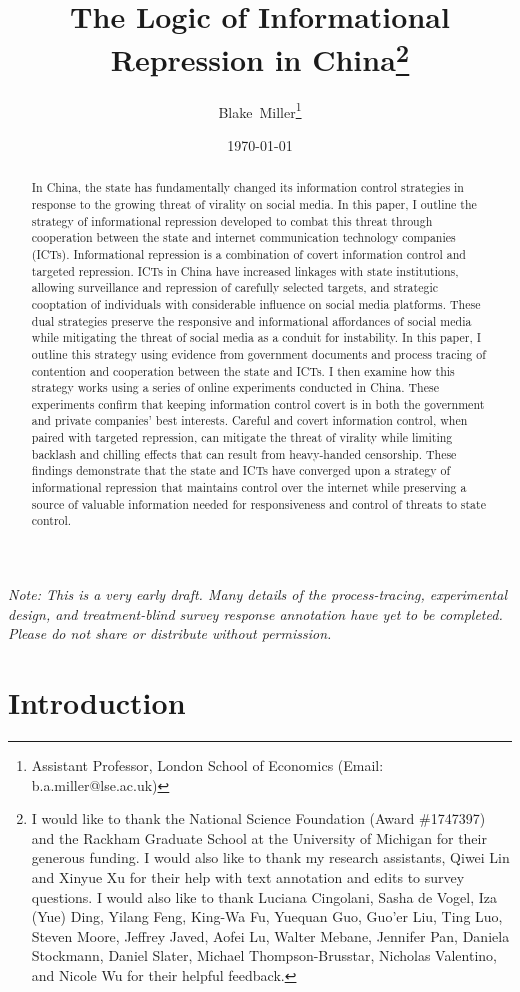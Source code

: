 \documentclass[11pt]{article}
\title{The Logic of Informational Repression in China\thanks{\normalsize I would like to thank the National Science Foundation (Award \#1747397) and the Rackham Graduate School at the University of Michigan for their generous funding. I would also like to thank my research assistants, Qiwei Lin and Xinyue Xu for their help with text annotation and edits to survey questions. I would also like to thank Luciana Cingolani, Sasha de Vogel, Iza (Yue) Ding, Yilang Feng, King-Wa Fu, Yuequan Guo, Guo'er Liu, Ting Luo, Steven Moore, Jeffrey Javed, Aofei Lu, Walter Mebane, Jennifer Pan, Daniela Stockmann, Daniel Slater, Michael Thompson-Brusstar, Nicholas Valentino, and Nicole Wu for their helpful feedback.}\\ \large }
\author{Blake\ Miller\thanks{\normalsize{Assistant Professor, London School of Economics} (Email: \mbox{b.a.miller@lse.ac.uk})}}
\date{\today}
\begin{document}
\maketitle

\begin{abstract}
\begin{normalsize}
In China, the state has fundamentally changed its information control strategies in response to the growing threat of virality on social media. In this paper, I outline the strategy of informational repression developed to combat this threat through cooperation between the state and internet communication technology companies (ICTs). Informational repression is a combination of covert information control and targeted repression. ICTs in China have increased linkages with state institutions, allowing surveillance and repression of carefully selected targets, and strategic cooptation of individuals with considerable influence on social media platforms. These dual strategies preserve the responsive and informational affordances of social media while mitigating the threat of social media as a conduit for instability. In this paper, I outline this strategy using evidence from government documents and process tracing of contention and cooperation between the state and ICTs. I then examine how this strategy works using a series of online experiments conducted in China. These experiments confirm that keeping information control covert is in both the government and private companies' best interests. Careful and covert information control, when paired with targeted repression, can mitigate the threat of virality while limiting backlash and chilling effects that can result from heavy-handed censorship. These findings demonstrate that the state and ICTs have converged upon a strategy of informational repression that maintains control over the internet while preserving a source of valuable information needed for responsiveness and control of threats to state control.
\end{normalsize}
\end{abstract}
\doublespacing

{\it Note: This is a very early draft. Many details of the process-tracing, experimental design, and treatment-blind survey response annotation have yet to be completed. Please do not share or distribute without permission.}

\section*{Introduction}
\end{document}
